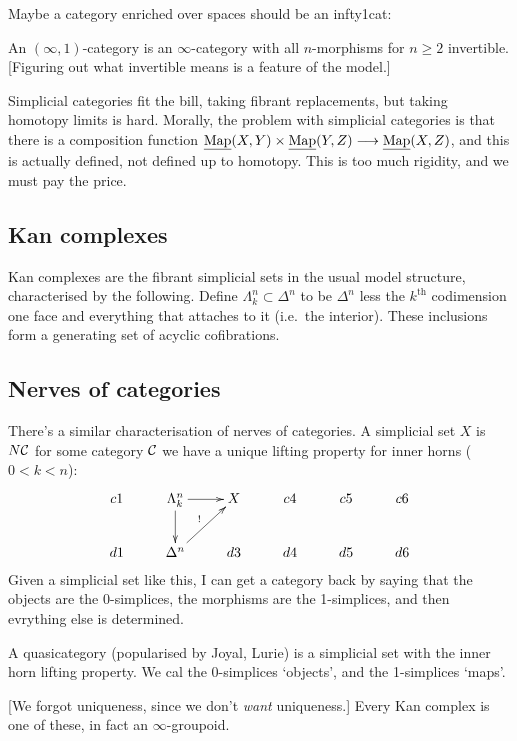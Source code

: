 \documentclass[11pt]{article}
\begin{document}
\begin{SaulInftyOneCats}
Maybe a category enriched over spaces should be an infty1cat:
\begin{defn*}
An $(\infty,1)$-category is an $\infty$-category with all $n$-morphisms for $n\geq2$ invertible. [Figuring out what invertible means is a feature of the model.]
\end{defn*}
Simplicial categories fit the bill, taking fibrant replacements, but taking homotopy limits is hard. Morally, the problem with simplicial categories is that there is a composition function $\underline{\operatorname{Map}}(X,Y)\times\underline{\operatorname{Map}}(Y,Z)\longrightarrow\underline{\operatorname{Map}}(X,Z)$, and this is actually defined, not defined up to homotopy. This is too much rigidity, and we must pay the price.
\subsection*{Kan complexes}
Kan complexes are the fibrant simplicial sets in the usual model structure, characterised by the following. Define $\Lambda^n_k\subset \Delta^n$ to be $\Delta^n$ less the $k^\text{th}$ codimension one face and everything that attaches to it (i.e.\ the interior). These inclusions form a generating set of acyclic cofibrations.
\subsection*{Nerves of categories}
There's a similar characterisation of nerves of categories. A simplicial set $X$ is $N\mathcal{C}$ for some category $\mathcal{C}$ \Iff we have a unique lifting property for inner horns ($0<k<n$):
\[\xymatrix{
 c1& \Lambda^n_k\ar[d]\ar[r]& X& c4& c5& c6\\
 d1& \Delta^n\ar[ur]^{!}& d3& d4& d5& d6\\
}\]
Given a simplicial set like this, I can get a category back by saying that the objects are the 0-simplices, the morphisms are the 1-simplices, and then evrything else is determined.
\begin{defn*}
A quasicategory (popularised by Joyal, Lurie) is a simplicial set with the inner horn lifting property. We cal the 0-simplices `objects', and the 1-simplices `maps'.
\end{defn*}
[We forgot uniqueness, since we don't \emph{want} uniqueness.]
Every Kan complex is one of these, in fact an $\infty$-groupoid.


\end{SaulInftyOneCats}
\end{document}
